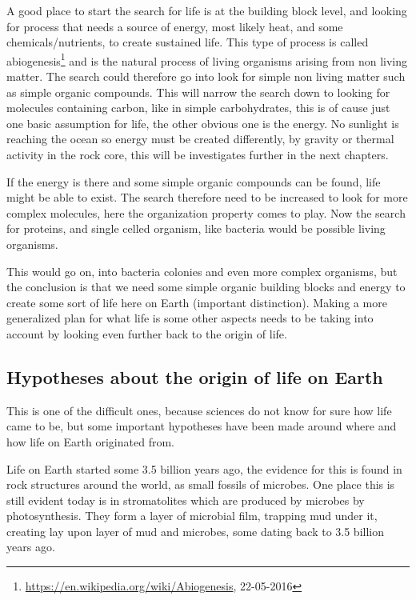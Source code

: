 A good place to start the search for life is at the building block level, and looking for process that needs a source of energy, most likely heat, and some chemicals/nutrients, to create sustained life. This type of process is called abiogenesis\footnote{\url{https://en.wikipedia.org/wiki/Abiogenesis}, 22-05-2016} and is the natural process of living organisms arising from non living matter. The search could therefore go into look for simple non living matter such as simple organic compounds. This will narrow the search down to looking for molecules containing carbon, like in simple carbohydrates, this is of cause just one basic assumption for life, the other obvious one is the energy. No sunlight is reaching the ocean so energy must be created differently, by gravity or thermal activity in the rock core, this will be investigates further in the next chapters.

If the energy is there and some simple organic compounds can be found, life might be able to exist. The search therefore need to be increased to look for more complex molecules, here the organization property comes to play.  Now the search for proteins, and single celled organism, like bacteria would be possible living organisms.

This would go on, into bacteria colonies and even more complex organisms, but the conclusion is that we need some simple organic building blocks and energy to create some sort of life here on Earth (important distinction). Making a more generalized plan for what life is some other aspects needs to be taking into account by looking even further back to the origin of life.

\subsection{Hypotheses about the origin of life on Earth}

This is one of the difficult ones, because sciences do not know for sure how life came to be, but some important hypotheses have been made around where and how life on Earth originated from.

Life on Earth started some 3.5 billion years ago, the evidence for this is found in rock structures around the world, as small fossils of microbes. One place this is still evident today is in stromatolites which are produced by microbes by photosynthesis. They form a layer of microbial film, trapping mud under it, creating lay upon layer of mud and microbes, some dating back to 3.5 billion years ago.

